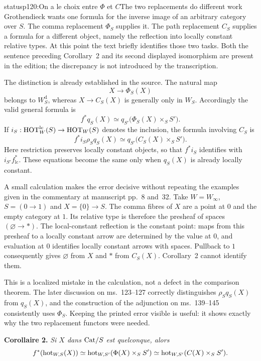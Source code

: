 \begin{dcomment}{status}{p120:On a le choix entre $\Phi$ et $C$}{The two replacements do different work}
Grothendieck wants one formula for the inverse image of an arbitrary category over $S$. The comma replacement $\Phi_S$ supplies it. The path replacement $C_S$ supplies a formula for a different object, namely the reflection into locally constant relative types. At this point the text briefly identifies those two tasks. Both the sentence preceding Corollary~2 and its second displayed isomorphism are present in the edition; the discrepancy is not introduced by the transcription.

The distinction is already established in the source. The natural map
\[
 X\longrightarrow\Phi_S(X)
\]
belongs to $W_S^{\mathrm d}$, whereas $X\longrightarrow C_S(X)$ is generally only in $W_S$. Accordingly the valid general formula is
\[
 f^*q_S(X)\simeq q_{S'}\bigl(\Phi_S(X)\times_S S'\bigr).
\]
If $i_S:\mathrm{HOT}_W^{\mathrm{lc}}(S)\to\mathrm{HOT}_W(S)$ denotes the inclusion, the formula involving $C_S$ is
\[
 f^*i_S\rho_S q_S(X)
 \simeq q_{S'}\bigl(C_S(X)\times_S S'\bigr).
\]
Here restriction preserves locally constant objects, so that $f^*i_S$ identifies with $i_{S'}f^*_{\mathrm{lc}}$. These equations become the same only when $q_S(X)$ is already locally constant.

A small calculation makes the error decisive without repeating the examples given in the commentary at manuscript pp.~8 and~32. Take $W=W_\infty$, $S=(0\to1)$ and $X=\{0\}\to S$. The comma fibres of $X$ are a point at $0$ and the empty category at $1$. Its relative type is therefore the presheaf of spaces $(\varnothing\to *)$. The local-constant reflection is the constant point: maps from this presheaf to a locally constant arrow are determined by the value at $0$, and evaluation at $0$ identifies locally constant arrows with spaces. Pullback to $1$ consequently gives $\varnothing$ from $X$ and $*$ from $C_S(X)$. Corollary~2 cannot identify them.

This is a localized mistake in the calculation, not a defect in the comparison theorem. The later discussion on ms.~123--127 correctly distinguishes $\rho_Sq_S(X)$ from $q_S(X)$, and the construction of the adjunction on ms.~139--145 consistently uses $\Phi_S$. Keeping the printed error visible is useful: it shows exactly why the two replacement functors were needed.
\end{dcomment}


\textbf{Corollaire 2.} \textit{Si $X$ dans} $\mathrm{Cat}/S$ \textit{est quelconque, alors}
\[
f^*(\mathrm{hot}_{W,S}(X)) \simeq \mathrm{hot}_{W,S'}(\Phi(X) \times_S S') \simeq \mathrm{hot}_{W,S'}(C(X) \times_S S').
\]

